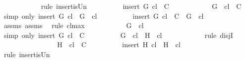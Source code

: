 \begin{isabellebody}
\ \ \ \ \ \ \ \ \ \ \isamarkupfalse%
\ {\isacharparenleft}rule\ insert{\isacharunderscore}is{\isacharunderscore}Un{\isacharparenright}\isanewline
\ \ \ \ \ \ \ \ \isamarkupfalse%
\ {\isachardoublequoteopen}insert\ G\ {\isacharquery}cl\ {\isasymin}\ C{\isachardoublequoteclose}\isanewline
\ \ \ \ \ \ \ \ \ \ \isamarkupfalse%
\ {\isacartoucheopen}{\isacharbraceleft}G{\isacharbraceright}\ {\isasymunion}\ {\isacharquery}cl\ {\isasymin}\ C{\isacartoucheclose}\ \isamarkupfalse%
\ {\isacharparenleft}simp\ only{\isacharcolon}\ {\isacartoucheopen}insert\ G\ {\isacharquery}cl\ {\isacharequal}\ {\isacharbraceleft}G{\isacharbraceright}\ {\isasymunion}\ {\isacharquery}cl{\isacartoucheclose}{\isacharparenright}\isanewline
\ \ \ \ \ \ \ \ \isamarkupfalse%
\ {\isachardoublequoteopen}insert\ G\ {\isacharquery}cl\ {\isasymin}\ C\ {\isasymLongrightarrow}\ G\ {\isasymin}\ {\isacharquery}cl{\isachardoublequoteclose}\isanewline
\ \ \ \ \ \ \ \ \ \ \isamarkupfalse%
\ assms{\isacharparenleft}{}{\isacharparenright}\ assms{\isacharparenleft}{}{\isacharparenright}\ \isamarkupfalse%
\ {\isacharparenleft}rule\ cl{\isacharunderscore}max{\isacharprime}{\isacharparenright}\isanewline
\ \ \ \ \ \ \ \ \isamarkupfalse%
\ \isamarkupfalse%
\ {\isachardoublequoteopen}G\ {\isasymin}\ {\isacharquery}cl{\isachardoublequoteclose}\isanewline
\ \ \ \ \ \ \ \ \ \ \isamarkupfalse%
\ {\isacharparenleft}simp\ only{\isacharcolon}\ {\isacartoucheopen}insert\ G\ {\isacharquery}cl\ {\isasymin}\ C{\isacartoucheclose}{\isacharparenright}\isanewline
\ \ \ \ \ \ \ \ \isamarkupfalse%
\ {\isachardoublequoteopen}G\ {\isasymin}\ {\isacharquery}cl\ {\isasymor}\ H\ {\isasymin}\ {\isacharquery}cl{\isachardoublequoteclose}\isanewline
\ \ \ \ \ \ \ \ \ \ \isamarkupfalse%
\ {\isacharparenleft}rule\ disjI{}{\isacharparenright}\isanewline
\ \ \ \ \ \ \isamarkupfalse%
\isanewline
\ \ \ \ \ \ \ \ \isamarkupfalse%
\ {\isachardoublequoteopen}{\isacharbraceleft}H{\isacharbraceright}\ {\isasymunion}\ {\isacharquery}cl\ {\isasymin}\ C{\isachardoublequoteclose}\isanewline
\ \ \ \ \ \ \ \ \isamarkupfalse%
\ {\isachardoublequoteopen}insert\ H\ {\isacharquery}cl\ {\isacharequal}\ {\isacharbraceleft}H{\isacharbraceright}\ {\isasymunion}\ {\isacharquery}cl{\isachardoublequoteclose}\isanewline
\ \ \ \ \ \ \ \ \ \ \isamarkupfalse%
\ {\isacharparenleft}rule\ insert{\isacharunderscore}is{\isacharunderscore}Un{\isacharparenright}\isanewline

\end{isabellebody}
